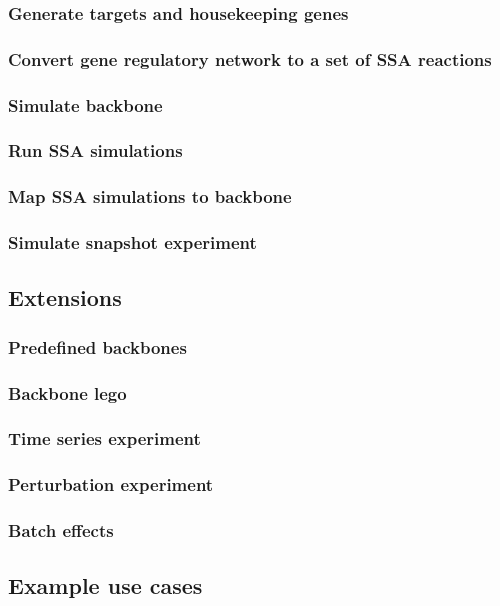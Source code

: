 \subsubsection{Generate targets and housekeeping genes}
\subsubsection{Convert gene regulatory network to a set of SSA reactions}
\subsubsection{Simulate backbone}
\subsubsection{Run SSA simulations}
\subsubsection{Map SSA simulations to backbone}
\subsubsection{Simulate snapshot experiment}

\subsection{Extensions}
\subsubsection{Predefined backbones}
\subsubsection{Backbone lego}
\subsubsection{Time series experiment}
\subsubsection{Perturbation experiment}
\subsubsection{Batch effects}

\subsection{Example use cases}
